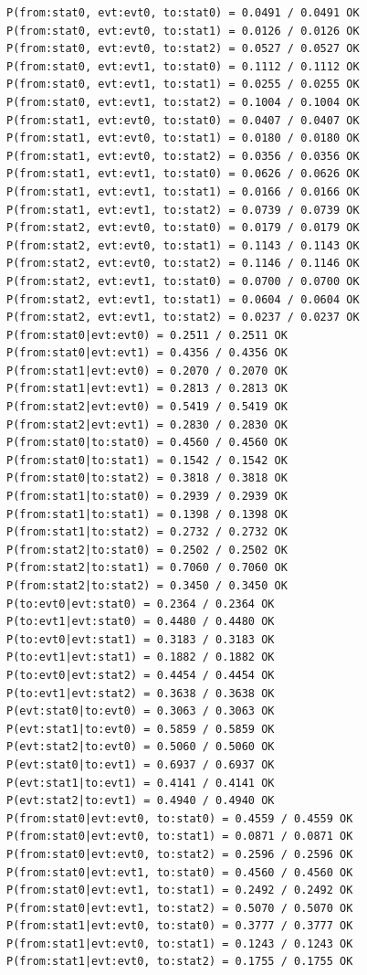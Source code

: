 \documentclass[12pt, a4paper]{article}
\begin{document}
\begin{scriptsize}
\begin{ttfamily}
\begin{lstlisting}
P(from:stat0, evt:evt0, to:stat0) = 0.0491 / 0.0491 OK
P(from:stat0, evt:evt0, to:stat1) = 0.0126 / 0.0126 OK
P(from:stat0, evt:evt0, to:stat2) = 0.0527 / 0.0527 OK
P(from:stat0, evt:evt1, to:stat0) = 0.1112 / 0.1112 OK
P(from:stat0, evt:evt1, to:stat1) = 0.0255 / 0.0255 OK
P(from:stat0, evt:evt1, to:stat2) = 0.1004 / 0.1004 OK
P(from:stat1, evt:evt0, to:stat0) = 0.0407 / 0.0407 OK
P(from:stat1, evt:evt0, to:stat1) = 0.0180 / 0.0180 OK
P(from:stat1, evt:evt0, to:stat2) = 0.0356 / 0.0356 OK
P(from:stat1, evt:evt1, to:stat0) = 0.0626 / 0.0626 OK
P(from:stat1, evt:evt1, to:stat1) = 0.0166 / 0.0166 OK
P(from:stat1, evt:evt1, to:stat2) = 0.0739 / 0.0739 OK
P(from:stat2, evt:evt0, to:stat0) = 0.0179 / 0.0179 OK
P(from:stat2, evt:evt0, to:stat1) = 0.1143 / 0.1143 OK
P(from:stat2, evt:evt0, to:stat2) = 0.1146 / 0.1146 OK
P(from:stat2, evt:evt1, to:stat0) = 0.0700 / 0.0700 OK
P(from:stat2, evt:evt1, to:stat1) = 0.0604 / 0.0604 OK
P(from:stat2, evt:evt1, to:stat2) = 0.0237 / 0.0237 OK
P(from:stat0|evt:evt0) = 0.2511 / 0.2511 OK
P(from:stat0|evt:evt1) = 0.4356 / 0.4356 OK
P(from:stat1|evt:evt0) = 0.2070 / 0.2070 OK
P(from:stat1|evt:evt1) = 0.2813 / 0.2813 OK
P(from:stat2|evt:evt0) = 0.5419 / 0.5419 OK
P(from:stat2|evt:evt1) = 0.2830 / 0.2830 OK
P(from:stat0|to:stat0) = 0.4560 / 0.4560 OK
P(from:stat0|to:stat1) = 0.1542 / 0.1542 OK
P(from:stat0|to:stat2) = 0.3818 / 0.3818 OK
P(from:stat1|to:stat0) = 0.2939 / 0.2939 OK
P(from:stat1|to:stat1) = 0.1398 / 0.1398 OK
P(from:stat1|to:stat2) = 0.2732 / 0.2732 OK
P(from:stat2|to:stat0) = 0.2502 / 0.2502 OK
P(from:stat2|to:stat1) = 0.7060 / 0.7060 OK
P(from:stat2|to:stat2) = 0.3450 / 0.3450 OK
P(to:evt0|evt:stat0) = 0.2364 / 0.2364 OK
P(to:evt1|evt:stat0) = 0.4480 / 0.4480 OK
P(to:evt0|evt:stat1) = 0.3183 / 0.3183 OK
P(to:evt1|evt:stat1) = 0.1882 / 0.1882 OK
P(to:evt0|evt:stat2) = 0.4454 / 0.4454 OK
P(to:evt1|evt:stat2) = 0.3638 / 0.3638 OK
P(evt:stat0|to:evt0) = 0.3063 / 0.3063 OK
P(evt:stat1|to:evt0) = 0.5859 / 0.5859 OK
P(evt:stat2|to:evt0) = 0.5060 / 0.5060 OK
P(evt:stat0|to:evt1) = 0.6937 / 0.6937 OK
P(evt:stat1|to:evt1) = 0.4141 / 0.4141 OK
P(evt:stat2|to:evt1) = 0.4940 / 0.4940 OK
P(from:stat0|evt:evt0, to:stat0) = 0.4559 / 0.4559 OK
P(from:stat0|evt:evt0, to:stat1) = 0.0871 / 0.0871 OK
P(from:stat0|evt:evt0, to:stat2) = 0.2596 / 0.2596 OK
P(from:stat0|evt:evt1, to:stat0) = 0.4560 / 0.4560 OK
P(from:stat0|evt:evt1, to:stat1) = 0.2492 / 0.2492 OK
P(from:stat0|evt:evt1, to:stat2) = 0.5070 / 0.5070 OK
P(from:stat1|evt:evt0, to:stat0) = 0.3777 / 0.3777 OK
P(from:stat1|evt:evt0, to:stat1) = 0.1243 / 0.1243 OK
P(from:stat1|evt:evt0, to:stat2) = 0.1755 / 0.1755 OK

\end{lstlisting}
\end{ttfamily}
\end{scriptsize}
\end{document}
